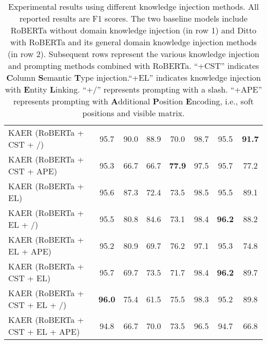 \begin{table*}[!ht]
{\begin{tabular}{l|cc|cccc|c}
KAER (RoBERTa + CST + /)          & 95.7            & 90.0                & 88.9          & 70.0            & 98.7          & 95.5          & \textbf{91.7}    \\
KAER (RoBERTa + CST + APE)     & 95.3            & 66.7              & 66.7          & \textbf{77.9} & 97.5          & 95.7          & 77.2             \\
KAER (RoBERTa + EL)                      & 95.6            & 87.3              & 72.4          & 73.5          & 98.5          & 95.5          & 89.1             \\
KAER (RoBERTa + EL + /)                   & 95.5            & 80.8              & 84.6          & 73.1          & 98.4          & \textbf{96.2} & 88.2             \\
KAER (RoBERTa + EL + APE)             & 95.2            & 80.9              & 69.7          & 76.2          & 97.1          & 95.3          & 74.8             \\
KAER (RoBERTa + CST + EL)       & 95.7            & 69.7              & 73.5          & 71.7          & 98.4          & \textbf{96.2} & 89.7             \\
KAER (RoBERTa + CST + EL + /)    & \textbf{96.0}     & 75.4              & 61.5          & 75.5          & 98.3          & 95.2          & 89.8             \\
KAER (RoBERTa + CST + EL + APE) & 94.8            & 66.7              & 70.0          & 73.5          & 96.5          & 94.7          & 66.8             \\ \hline
\end{tabular}
}
\vspace{-0.2cm}
\caption{Experimental results using different knowledge injection methods. All reported results are F1 scores. The two baseline models include RoBERTa without domain knowledge injection (in row 1) and Ditto with RoBERTa and its general domain knowledge injection methods (in row 2). 
Subsequent rows represent the various knowledge injection and prompting methods combined with RoBERTa. ``+CST'' indicates \textbf{C}olumn \textbf{S}emantic \textbf{T}ype injection.``+EL'' indicates knowledge injection with \textbf{E}ntity \textbf{L}inking. ``+/'' represents prompting with a slash. ``+APE'' represents prompting with \textbf{A}dditional \textbf{P}osition \textbf{E}ncoding, i.e., soft positions and visible matrix.}
\label{tab:injection_results}
\vspace{-0.5cm}
\end{table*}


